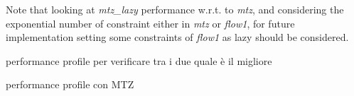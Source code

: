 Note that looking at \textit{mtz\_lazy} performance w.r.t. to \textit{mtz}, and considering the exponential number of constraint either in \textit{mtz} or \textit{flow1}, for future implementation setting some constraints of \textit{flow1} as lazy should be considered. 

performance profile per verificare tra i due quale è il migliore

performance profile con MTZ
